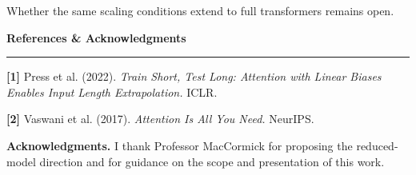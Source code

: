\documentclass[12pt]{article}
\newcommand{\sectionheading}[1]{%
  {\RaggedRight\color{Navy}\bfseries\fontsize{34}{39}\selectfont #1\par}%
  \vspace{0.05in}%
  {\color{Navy}\rule{0.78in}{3pt}}\par
  \vspace{0.12in}%
}
\begin{document}
\begin{minipage}[t]{8.30in}
\begin{contentcard}[height=4.70in]
\begin{minipage}[t][4.15in][t]{\linewidth}
\vspace{0.32in}
Whether the same scaling conditions extend to full transformers remains open.
\end{minipage}
\end{contentcard}

\vspace{0.28in}
\begin{contentcard}[height=5.26in]
\begin{minipage}[t][4.71in][t]{\linewidth}
\vspace{0pt}
\sectionheading{References \& Acknowledgments}
\fontsize{23}{28}\selectfont
\textbf{[1]} Press et al. (2022). \textit{Train Short, Test Long: Attention
with Linear Biases Enables Input Length Extrapolation.} ICLR.\par
\textbf{[2]} Vaswani et al. (2017). \textit{Attention Is All You Need.}
NeurIPS.

\vfill
\textbf{Acknowledgments.} I thank Professor MacCormick for proposing the
reduced-model direction and for guidance on the scope and presentation of this
work.
\end{minipage}
\end{contentcard}
\end{minipage}
\end{document}
